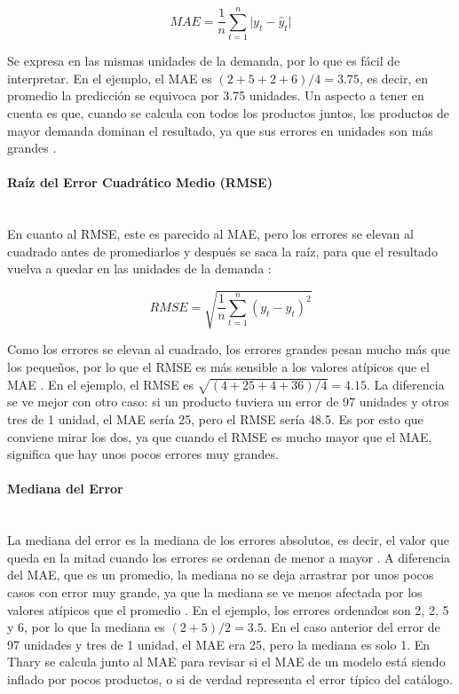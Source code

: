 \begin{equation}
MAE = \frac{1}{n}\sum_{t=1}^{n} \lvert y_t - \hat{y}_t \rvert
\end{equation}

Se expresa en las mismas unidades de la demanda, por lo que es fácil de interpretar. En el ejemplo, el MAE es $(2 + 5 + 2 + 6)/4 = 3.75$, es decir, en promedio la predicción se equivoca por 3.75 unidades. Un aspecto a tener en cuenta es que, cuando se calcula con todos los productos juntos, los productos de mayor demanda dominan el resultado, ya que sus errores en unidades son más grandes \cite{hewamalage2023evaluation}.

\paragraph{Raíz del Error Cuadrático Medio (RMSE)}\mbox{}\\
En cuanto al RMSE, este es parecido al MAE, pero los errores se elevan al cuadrado antes de promediarlos y después se saca la raíz, para que el resultado vuelva a quedar en las unidades de la demanda \cite{hewamalage2023evaluation}:

\begin{equation}
RMSE = \sqrt{\frac{1}{n}\sum_{t=1}^{n} (y_t - \hat{y}_t)^2}
\end{equation}

Como los errores se elevan al cuadrado, los errores grandes pesan mucho más que los pequeños, por lo que el RMSE es más sensible a los valores atípicos que el MAE \cite{hewamalage2023evaluation}. En el ejemplo, el RMSE es $\sqrt{(4 + 25 + 4 + 36)/4} = 4.15$. La diferencia se ve mejor con otro caso: si un producto tuviera un error de 97 unidades y otros tres de 1 unidad, el MAE sería 25, pero el RMSE sería 48.5. Es por esto que conviene mirar los dos, ya que cuando el RMSE es mucho mayor que el MAE, significa que hay unos pocos errores muy grandes.

\paragraph{Mediana del Error}\mbox{}\\
La mediana del error es la mediana de los errores absolutos, es decir, el valor que queda en la mitad cuando los errores se ordenan de menor a mayor \cite{hewamalage2023evaluation}. A diferencia del MAE, que es un promedio, la mediana no se deja arrastrar por unos pocos casos con error muy grande, ya que la mediana se ve menos afectada por los valores atípicos que el promedio \cite{hewamalage2023evaluation}. En el ejemplo, los errores ordenados son 2, 2, 5 y 6, por lo que la mediana es $(2 + 5)/2 = 3.5$. En el caso anterior del error de 97 unidades y tres de 1 unidad, el MAE era 25, pero la mediana es solo 1. En Thary se calcula junto al MAE para revisar si el MAE de un modelo está siendo inflado por pocos productos, o si de verdad representa el error típico del catálogo.

